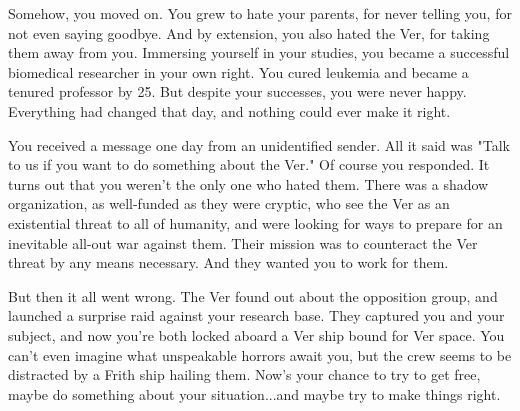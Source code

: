 \documentclass[char]{guildcamp4}
\begin{document}
Somehow, you moved on. You grew to hate your parents, for never telling you, for not even saying goodbye. And by extension, you also hated the Ver, for taking them away from you. Immersing yourself in your studies, you became a successful biomedical researcher in your own right. You cured leukemia and became a tenured professor by 25. But despite your successes, you were never happy. Everything had changed that day, and nothing could ever make it right.

You received a message one day from an unidentified sender. All it said was "Talk to us if you want to do something about the Ver." Of course you responded. It turns out that you weren't the only one who hated them. There was a shadow organization, as well-funded as they were cryptic, who see the Ver as an existential threat to all of humanity, and were looking for ways to prepare for an inevitable all-out war against them. Their mission was to counteract the Ver threat by any means necessary. And they wanted you to work for them.

But then it all went wrong. The Ver found out about the opposition group, and launched a surprise raid against your research base. They captured you and your subject, and now you're both locked aboard a Ver ship bound for Ver space. You can't even imagine what unspeakable horrors await you, but the crew seems to be distracted by a Frith ship hailing them. Now's your chance to try to get free, maybe do something about your situation...and maybe try to make things right.
\end{document}

